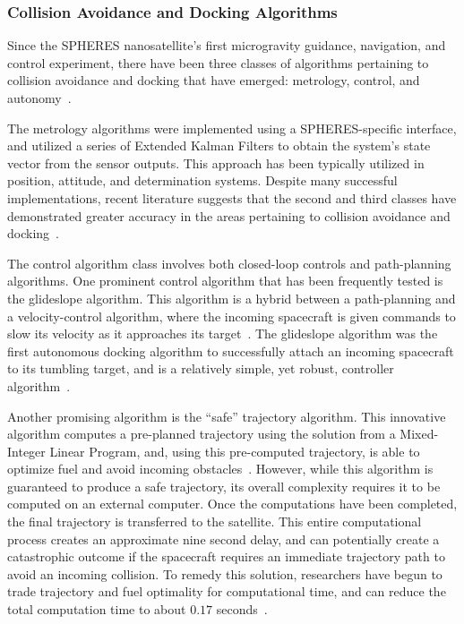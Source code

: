 \documentclass[paper=letter, fontsize=11pt]{scrartcl} %
\numberwithin{equation}{section} %
\numberwithin{figure}{section} %
\numberwithin{table}{section} %
\begin{document}
\subsubsection{Collision Avoidance and Docking Algorithms}
Since the SPHERES nanosatellite's first microgravity guidance, navigation, and control experiment, there have been three classes of algorithms pertaining to collision avoidance and docking that have emerged: metrology, control, and autonomy~\cite{SPHERES_form}.

The metrology algorithms were implemented using a SPHERES-specific interface, and utilized a series of Extended Kalman Filters to obtain the system's state vector from the sensor outputs. This approach has been typically utilized in position, attitude, and determination systems. Despite many successful implementations, recent literature suggests that the second and third classes have demonstrated greater accuracy in the areas pertaining to collision avoidance and docking~\cite{SPHERES_form}.

The control algorithm class involves both closed-loop controls and path-planning algorithms. One prominent control algorithm that has been frequently tested is the glideslope algorithm. This algorithm is a hybrid between a path-planning and a velocity-control algorithm, where the incoming spacecraft is given commands to slow its velocity as it approaches its target~\cite{SPHERES_form,SPHERES_micro,dist,virt_sim}. The glideslope algorithm was the first autonomous docking algorithm to successfully attach an incoming spacecraft to its tumbling target, and is a relatively simple, yet robust, controller algorithm~\cite{SPHERES_micro}.

Another promising algorithm is the ``safe'' trajectory algorithm. This innovative algorithm computes a pre-planned trajectory using the solution from a Mixed-Integer Linear Program, and, using this pre-computed trajectory, is able to optimize fuel and avoid incoming obstacles~\cite{SPHERES_micro}. However, while this algorithm is guaranteed to produce a safe trajectory, its overall complexity requires it to be computed on an external computer. Once the computations have been completed, the final trajectory is transferred to the satellite. This entire computational process creates an approximate nine second delay, and can potentially create a catastrophic outcome if the spacecraft requires an immediate trajectory path to avoid an incoming collision. To remedy this solution, researchers have begun to trade trajectory and fuel optimality for computational time, and can reduce the total computation time to about $0.17$ seconds~\cite{SPHERES_micro}.
\end{document}
